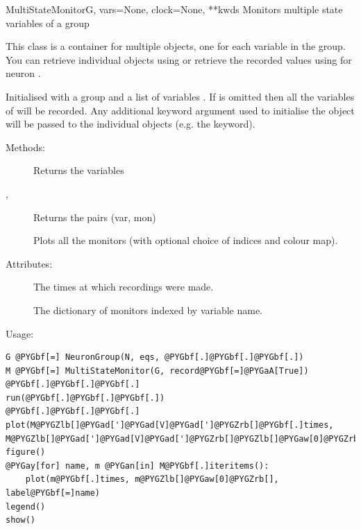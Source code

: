 \documentclass[letterpaper,10pt,english]{manual}
\begin{document}
\hypertarget{brian.MultiStateMonitor}{}\begin{classdesc}{MultiStateMonitor}{G, vars=None, clock=None, **kwds}
Monitors multiple state variables of a group

This class is a container for multiple \hyperlink{brian.StateMonitor}{} objects,
one for each variable in the group. You can retrieve individual
\hyperlink{brian.StateMonitor}{} objects using  or retrieve the
recorded values using  for neuron .

Initialised with a group  and a list of variables . If 
 is omitted then all the variables of  will be recorded.
Any additional keyword argument used to initialise the object will
be passed to the individual \hyperlink{brian.StateMonitor}{} objects (e.g. the
 keyword).

Methods:
\begin{description}
\item[]
Returns the variables

\item[, ]
Returns the pairs (var, mon)

\item[]
Plots all the monitors (with optional choice of indices and
colour map).

\end{description}

Attributes:
\begin{description}
\item[]
The times at which recordings were made.

\item[]
The dictionary of monitors indexed by variable name.

\end{description}

Usage:

\begin{Verbatim}[commandchars=@\[\]]
G @PYGbf[=] NeuronGroup(N, eqs, @PYGbf[.]@PYGbf[.]@PYGbf[.])
M @PYGbf[=] MultiStateMonitor(G, record@PYGbf[=]@PYGaA[True])
@PYGbf[.]@PYGbf[.]@PYGbf[.]
run(@PYGbf[.]@PYGbf[.]@PYGbf[.])
@PYGbf[.]@PYGbf[.]@PYGbf[.]
plot(M@PYGZlb[]@PYGad[']@PYGad[V]@PYGad[']@PYGZrb[]@PYGbf[.]times, M@PYGZlb[]@PYGad[']@PYGad[V]@PYGad[']@PYGZrb[]@PYGZlb[]@PYGaw[0]@PYGZrb[])
figure()
@PYGay[for] name, m @PYGan[in] M@PYGbf[.]iteritems():
    plot(m@PYGbf[.]times, m@PYGZlb[]@PYGaw[0]@PYGZrb[], label@PYGbf[=]name)
legend()
show()
\end{Verbatim}
\end{classdesc}
\end{document}
